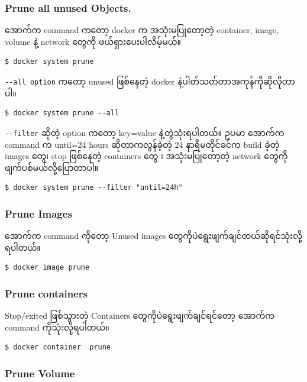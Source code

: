 \subsubsection{Prune all unused
Objects.}\label{prune-all-unused-objects.}

အောက်က command ကတော့ docker က အသုံးမပြုတော့တဲ့ container, image, volume
နဲ့ network တွေကို ဖယ်ရှားပေးပါလိမ့်မယ်။

\begin{verbatim}
$ docker system prune
\end{verbatim}

\texttt{-{}-‌all option} ကတော့ unused ဖြစ်နေတဲ့ docker
နဲ့ပါတ်သတ်တာအကုန်ကိုဆိုလိုတာပါ။

\begin{verbatim}
$ docker system prune --all
\end{verbatim}

\texttt{-{}-filter} ဆိုတဲ့ option ကတော့ key=value နဲ့တွဲသုံးရပါတယ်။ ဥပမာ
အောက်က command က until=24 hours ဆိုတာကလွန်ခဲ့တဲ့ 24 နာရီမတိုင်ခင်က build
ခဲ့တဲ့ images တွေ၊ stop ဖြစ်နေတဲ့ containers တွေ ၊ အသုံးမပြုတော့တဲ့
network တွေကိုဖျက်ပစ်မယ်လို့ပြောတာပါ။

\begin{verbatim}
$ docker system prune --filter "until=24h"
\end{verbatim}

\subsubsection{Prune Images}\label{prune-images}

အောက်က command ကိုတော့ Unused images
တွေကိုပဲရွေးဖျက်ချင်တယ်ဆိုရင်သုံးလို့ရပါတယ်။

\begin{verbatim}
$ docker image prune
\end{verbatim}

\subsubsection{Prune containers}\label{prune-containers}

Stop/exited ဖြစ်သွားတဲ့ Containers တွေကိုပဲရွေးဖျက်ချင်ရင်တော့ အောက်က
command ကိုသုံးလို့ရပါတယ်။

\begin{verbatim}
$ docker container  prune
\end{verbatim}

\subsubsection{Prune Volume}\label{prune-volume}

